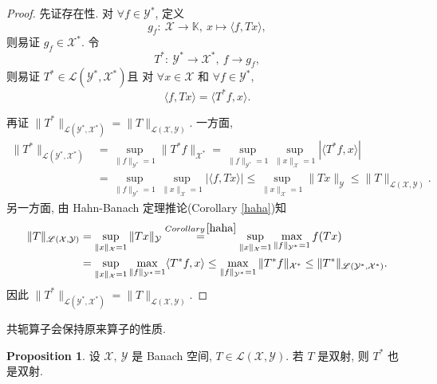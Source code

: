 \documentclass[a4paper,11pt]{article}
\theoremstyle{definition}
\newtheorem{proposition}[theorem]{Proposition}
\begin{document}
\begin{proof}
    先证存在性. 对 $ \forall f \in \mathcal{Y}^* $, 定义
    $$
        g_f :\ \mathcal{X} \to \mathbb{K},\ x \mapsto \langle f, Tx \rangle,
    $$
    则易证 $ g_f \in \mathcal{X}^* $. 令
    $$
        T^* :\ \mathcal{Y}^* \to \mathcal{X}^*,\ f \to g_f,
    $$
    则易证 $ T^* \in \mathscr{L}(\mathcal{Y}^*, \mathcal{X}^*) $且
    对 $ \forall x \in \mathcal{X} $ 和 $ \forall f \in \mathcal{Y}^* $,
    $$
        \langle f, Tx \rangle = \langle T^* f, x \rangle.
    $$
    
    再证 $ \| T^* \|_{\mathscr{L}(\mathcal{Y}^*, \mathcal{X}^*)} = \| T \|_{\mathscr{L}(\mathcal{X}, \mathcal{Y})} $.
    一方面, 
    \begin{align*}
        \| T^* \|_{\mathscr{L}(\mathcal{Y}^*, \mathcal{X}^*)}
            &= \sup_{\| f \|_{\mathcal{Y}^*} = 1}  \| T^* f \|_{\mathcal{X}^*}
            = \sup_{\| f \|_{\mathcal{Y}^*} = 1} \sup_{\| x \|_\mathcal{X} = 1} |\langle T^* f, x \rangle| \\
            &= \sup_{\| f \|_{\mathcal{Y}^*} = 1} \sup_{\| x \|_\mathcal{X} = 1} |\langle f, Tx \rangle|
            \leq \sup_{\| x \|_\mathcal{X} = 1} \| Tx \|_\mathcal{Y}
            \leq \| T \|_{\mathscr{L}(\mathcal{X}, \mathcal{Y})}.
    \end{align*}
    另一方面, 由 Hahn-Banach 定理推论(Corollary \ref{haha})知
    \begin{align*}
        \| T \|_{\mathscr{L}(\mathcal{X}, \mathcal{Y})}
            &= \sup_{\| x \|_\mathcal{X} = 1}  \| T x \|_\mathcal{Y}
            \overset{Corollary \, \ref{haha}}{=} 
                \sup_{\| x \|_\mathcal{X} = 1} \max_{\| f \|_{\mathcal{Y}^*} = 1}  f(T x) \\
            &= \sup_{\| x \|_\mathcal{X} = 1} \max_{\| f \|_{\mathcal{Y}^*} = 1} \langle T^* f, x \rangle
            \leq \max_{\| f \|_{\mathcal{Y}^*} = 1} \| T^* f \|_{\mathcal{X}^*}
            \leq \| T^* \|_{\mathscr{L}(\mathcal{Y}^*, \mathcal{X}^*)}.
    \end{align*}
    因此 $ \| T^* \|_{\mathscr{L}(\mathcal{Y}^*, \mathcal{X}^*)} = \| T \|_{\mathscr{L}(\mathcal{X}, \mathcal{Y})} $.
\end{proof}

共轭算子会保持原来算子的性质.

\begin{proposition} \label{1}
    设 $ \mathcal{X},\ \mathcal{Y} $ 是 Banach 空间, $ T \in \mathscr{L}(\mathcal{X}, \mathcal{Y}) $. 
    若 $ T $ 是双射, 则 $ T^* $ 也是双射.
\end{proposition}
\end{document}
